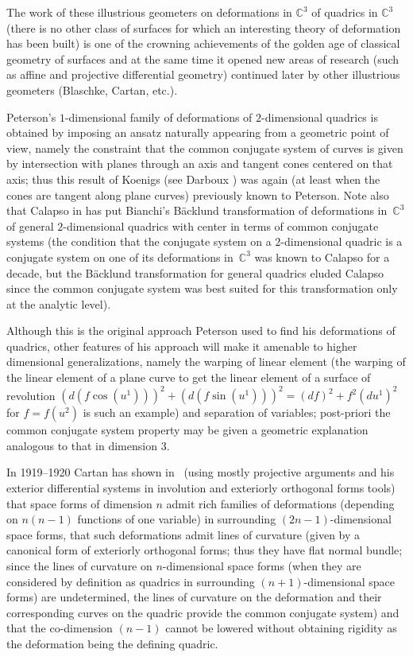 \documentclass[11pt]{article}
\begin{document}
The work of these illustrious geometers on deformations in
$\mathbb{C}^3$ of quadrics in $\mathbb{C}^3$ (there is no other
class of surfaces for which an interesting theory of deformation
has been built) is one of the crowning achievements of the golden
age of classical geometry of surfaces and at the same time it
opened new areas of research (such as af\/f\/ine and projective
dif\/ferential geometry) continued later by other illustrious
geometers (Blaschke, Cartan, etc.).

Peterson's $1$-dimensional family of deformations of
$2$-dimensional quadrics is obtained by imposing an ansatz
naturally appearing from a geometric point of view, namely the
constraint that the common conjugate system of curves is given by
intersection with planes through an axis and tangent cones
centered on that axis; thus this result of Koenigs (see Darboux
\cite[\S\S~91--101]{D}) was again (at least when the cones are
tangent along plane curves) previously known to Peterson. Note
also that Calapso in \cite{Ca} has put Bianchi's B\"{a}cklund
transformation of deformations in~$\mathbb{C}^3$ of general
$2$-dimensional quadrics with center in terms of common conjugate
systems (the condition that the conjugate system on a
$2$-dimensional quadric is a conjugate system on one of its
deformations in~$\mathbb{C}^3$ was known to Calapso for a decade,
but the B\"{a}cklund transformation for general quadrics eluded
Calapso since the common conjugate system was best suited for this
transformation only at the analytic level).

Although this is the original approach Peterson used to f\/ind his
deformations of quadrics, other features of his approach will make
it amenable to higher dimensional generalizations, namely the
warping of linear element (the warping of the linear element of a
plane curve to get the linear element of a surface of revolution
$(d(f\cos(u^1)))^2+(d(f\sin(u^1)))^2=(df)^2+f^2(du^1)^2$ for
$f=f(u^2)$ is such an example) and separation of variables;
post-priori the common conjugate system property may be given a
geometric explanation analogous to that in dimension $3$.

In 1919--1920 Cartan has shown in~\cite{C} (using mostly projective
arguments and his exterior dif\/ferential systems in involution and
exteriorly orthogonal forms tools) that space forms of dimension
$n$ admit rich families of deformations (depending on $n(n-1)$
functions of one variable) in surrounding $(2n-1)$-dimensional
space forms, that such deformations admit lines of curvature
(given by a canonical form of exteriorly orthogonal forms; thus
they have f\/lat normal bundle; since the lines of curvature on
$n$-dimensional space forms (when they are considered by
def\/inition as quadrics in surrounding $(n+1)$-dimensional space
forms) are undetermined, the lines of curvature on the deformation
and their corresponding curves on the quadric provide the common
conjugate system) and that the co-dimension $(n-1)$ cannot be
lowered without obtaining rigidity as the deformation being the
def\/ining quadric.
\end{document}
